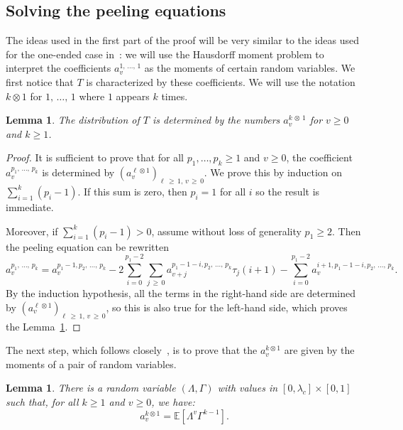 \documentclass[10pt]{amsart}
\newtheorem{lemm}[theo]{Lemma}\newtheorem{prop}[theo]{Proposition}\newtheorem{coro}[theo]{Corollary}\newtheorem{conj}[theo]{Conjecture}
\theoremstyle{definition}\newtheorem{defi}[theo]{Definition}\newtheorem{rema}[theo]{Remark}\newtheorem{exam}[theo]{Example}\newtheorem{exem}[theo]{Example}\newtheorem{nota}[theo]{Notation}
\newcommand{\E}{\mathbb{E}}
\begin{document}
\subsection{Solving the peeling equations}\label{subsec_solve_peeling}

The ideas used in the first part of the proof will be very similar to the ideas used for the one-ended case in~\cite[Section~3]{BL19}: we will use the Hausdorff moment problem to interpret the coefficients $a_v^{1,\,\dots,\,1}$ as the moments of certain random variables. We first notice that $T$ is characterized by these coefficients. We will use the notation $k \otimes 1$ for $1,\,\dots,\,1$ where $1$ appears $k$ times.

\begin{lemm}\label{lem_determined_by_one}
The distribution of $T$ is determined by the numbers $a_v^{k\,\otimes\,1}$ for $v \geq 0$ and $k \geq 1$.
\end{lemm}

\begin{proof}
It is sufficient to prove that for all $p_1, \dots, p_k \geq 1$ and $v \geq 0$, the coefficient $a_v^{p_1,\,\dots,\,p_k}$ is determined by $(a_v^{\ell \otimes 1})_{\ell\,\geq\,1, \, v\,\geq\,0}$. We prove this by induction on $\sum_{i=1}^k (p_i-1)$. If this sum is zero, then $p_i=1$ for all $i$ so the result is immediate.

Moreover, if $\sum_{i=1}^k (p_i-1)>0$, assume without loss of generality $p_1 \geq 2$. Then the peeling equation can be rewritten
\[
a_v^{p_1,\,\dots,\,p_k} = a_v^{p_1-1, p_2,\,\dots,\, p_k} -2 \sum_{i=0}^{p_1-2} \sum_{j\,\geq\,0} a_{v+j}^{p_1-1-i, p_2,\,\dots,\,p_k} \tau_j(i+1) - \sum_{i=0}^{p_1-2} a_v^{i+1, p_1-1-i,p_2,\,\dots,\, p_k}.
\]
By the induction hypothesis, all the terms in the right-hand side are determined by $(a_v^{\ell \otimes 1})_{\ell\,\geq\,1, \, v\,\geq\,0}$, so this is also true for the left-hand side, which proves the Lemma~\ref{lem_determined_by_one}.
\end{proof}

The next step, which follows closely~\cite[Section~3]{BL19}, is to prove that the $a_v^{k \otimes 1}$ are given by the moments of a pair of random variables.

\begin{lemm}\label{lem_apv_as_moments}
There is a random variable $\left(\Lambda, \Gamma \right)$ with values in $[0, \lambda_c] \times [0,1]$ such that, for all $k \geq 1$ and $v \geq 0$, we have:
\begin{equation}\label{eqn_apv_as_moments}
a_v^{k \otimes 1} = \E \left[\Lambda^{v} \Gamma^{k-1} \right].
\end{equation}
\end{lemm}
\end{document}
